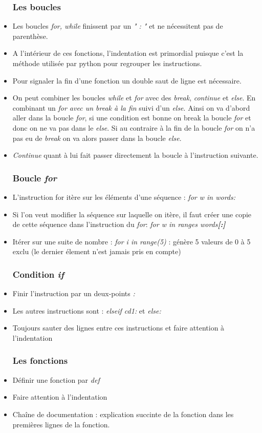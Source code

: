 \documentclass[12pt,a4paper]{article}
\begin{document}
\begin{itemize}
\subsubsection{Les boucles}
\item Les boucles \textit{for, while} finissent par un \textit{" : "} et ne nécessitent pas de parenthèse.
\item A l'intérieur de ces fonctions, l'indentation est primordial puisque c'est la méthode utilisée par python pour regrouper les instructions. 
\item Pour signaler la fin d'une fonction un double saut de ligne est nécessaire.
\item On peut combiner les boucles \textit{while} et \textit{for} avec des \textit{break}, \textit{continue} et \textit{else}. 
\newline En combinant un \textit{for avec un break à la fin} suivi d'un \textit{else}. Ainsi on va d'abord aller dans la boucle \textit{for}, si une condition est bonne on break la boucle \textit{for} et donc on ne va pas dans le \textit{else}. Si au contraire à la fin de la boucle \textit{for} on n'a pas eu de \textit{break} on va alors passer dans la boucle \textit{else}.
\item \textit{Continue} quant à lui fait passer directement la boucle à l'instruction suivante.

\subsubsection{Boucle \textit{for}}
\item L'instruction for itère sur les éléments d'une séquence : \textit{for w in words:}
\item Si l'on veut modifier la séquence sur laquelle on itère, il faut créer une copie de cette séquence dans l'instruction du \textit{for}: \textit{for w in ranges words\textbf{[:]}}
\item Itérer sur une suite de nombre : \textit{for i in range(5)} : génère 5 valeurs de 0 à 5 exclu (le dernier élement n'est jamais pris en compte)

\subsubsection{Condition \textit{if}}
\item Finir l'instruction par un deux-points \textit{:}
\item Les autres instructions sont : \textit{elseif cd1:} et \textit{else:}
\item Toujours sauter des lignes entre ces instructions et faire attention à l'indentation

\subsubsection{Les fonctions}
\item Définir une fonction par \textit{def}
\item Faire attention à l'indentation
\item Chaîne de documentation : explication succinte de la fonction dans les premières lignes de la fonction.

\end{itemize}
\end{document}

